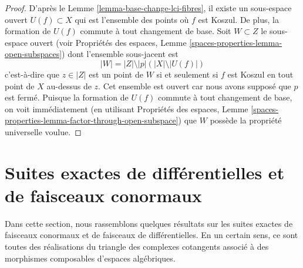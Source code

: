 \begin{proof}
D'après le Lemme \ref{lemma-base-change-lci-fibres},
il existe un sous-espace ouvert $U(f) \subset X$ qui est l'ensemble des
points où $f$ est Koszul. De plus, la formation de $U(f)$ commute
à tout changement de base. Soit $W \subset Z$ le sous-espace ouvert
(voir
Propriétés des espaces, Lemme
\ref{spaces-properties-lemma-open-subspaces})
dont l'ensemble sous-jacent est
$$
|W| = |Z| \setminus |p|\left(|X| \setminus |U(f)|\right)
$$
c'est-à-dire que $z \in |Z|$ est un point de $W$ si et seulement si $f$ est Koszul
en tout point de $X$ au-dessus de $z$. Cet ensemble est ouvert car nous
avons supposé que $p$ est fermé. Puisque la formation de $U(f)$
commute à tout changement de base, on voit immédiatement (en utilisant
Propriétés des espaces, Lemme
\ref{spaces-properties-lemma-factor-through-open-subspace})
que $W$ possède la propriété universelle voulue.
\end{proof}








\section{Suites exactes de différentielles et de faisceaux conormaux}
\label{section-exact}

\noindent
Dans cette section, nous rassemblons quelques résultats sur les suites exactes de faisceaux
conormaux et de faisceaux de différentielles. En un certain sens, ce sont toutes des
réalisations du triangle des complexes cotangents associé à des
morphismes composables d'espaces algébriques.

